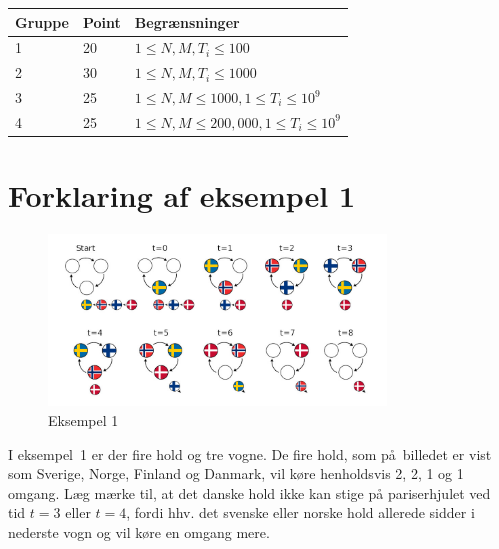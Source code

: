 \noindent
\begin{tabular}{| l | l | l |}
\hline
Gruppe & Point & Begrænsninger \\ \hline
1     & 20    & $1 \le N, M, T_i \le 100$ \\ \hline
2     & 30    & $1 \le N, M, T_i \le 1000$ \\ \hline
3     & 25    & $1 \le N, M \le 1000, 1 \le T_i \le 10^9$ \\ \hline
4     & 25    & $1 \le N, M \le 200,000, 1 \le T_i \le 10^9$ \\ \hline
\end{tabular}

\section*{Forklaring af eksempel 1}

\begin{figure}[h]
	\centering
\includegraphics[width=0.8\textwidth]{sample1}
\caption{Eksempel 1}
\end{figure}

I eksempel~1 er der fire hold og tre vogne.
De fire hold, som på billedet er vist som Sverige, Norge, Finland og Danmark, vil køre henholdsvis 2, 2, 1 og 1 omgang.
Læg mærke til, at det danske hold ikke kan stige på pariserhjulet ved tid $t=3$ eller $t=4$, fordi hhv. det svenske eller norske hold allerede sidder i nederste vogn og vil køre en omgang mere.
